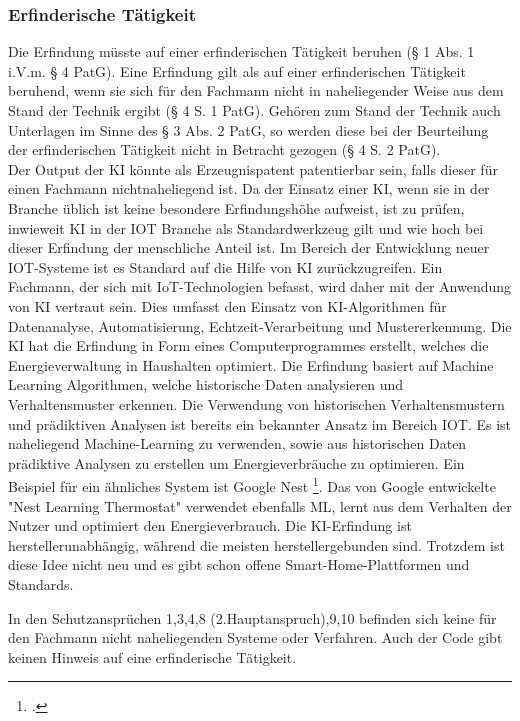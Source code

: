 \subsubsection{Erfinderische Tätigkeit}
Die Erfindung müsste auf einer erfinderischen Tätigkeit beruhen (§ 1 Abs. 1 i.V.m. § 4 PatG).
Eine Erfindung gilt als auf einer erfinderischen Tätigkeit beruhend, wenn sie sich für den Fachmann
nicht in naheliegender Weise aus dem Stand der Technik ergibt (§ 4 S. 1 PatG). Gehören zum Stand
der Technik auch Unterlagen im Sinne des § 3 Abs. 2 PatG, so werden diese bei der Beurteilung der
erfinderischen Tätigkeit nicht in Betracht gezogen (§ 4 S. 2 PatG).
\\
Der Output der KI könnte als Erzeugnispatent patentierbar sein,
falls dieser für einen Fachmann nichtnaheliegend ist.
Da der Einsatz einer KI, wenn sie in der Branche üblich ist keine besondere
Erfindungshöhe aufweist, ist zu prüfen, inwieweit KI in der IOT Branche
als Standardwerkzeug gilt und wie hoch bei dieser Erfindung der menschliche 
Anteil ist. Im Bereich der Entwicklung neuer IOT-Systeme ist es Standard auf
die Hilfe von KI zurückzugreifen. 
Ein Fachmann, der sich mit IoT-Technologien befasst, wird daher mit der Anwendung von KI 
vertraut sein. 
Dies umfasst den Einsatz von KI-Algorithmen für Datenanalyse, 
Automatisierung, Echtzeit-Verarbeitung und Mustererkennung.
Die KI hat die Erfindung in Form eines Computerprogrammes erstellt,
welches die Energieverwaltung in Haushalten optimiert.
Die Erfindung basiert auf Machine Learning Algorithmen, welche
historische Daten analysieren und Verhaltensmuster erkennen.
Die Verwendung von historischen Verhaltensmustern und prädiktiven
Analysen ist bereits ein bekannter Ansatz im Bereich IOT.
Es
ist naheliegend Machine-Learning zu verwenden, 
sowie aus historischen Daten prädiktive Analysen
zu erstellen um 
Energieverbräuche zu optimieren. Ein
Beispiel für ein ähnliches System ist 
Google Nest \footcite{YourHelpfulHome}.
Das von Google entwickelte "Nest Learning Thermostat" verwendet
ebenfalls ML, lernt aus dem Verhalten der Nutzer und
optimiert den Energieverbrauch.
Die KI-Erfindung ist herstellerunabhängig, während
die meisten herstellergebunden sind. Trotzdem ist 
diese Idee nicht neu und es gibt schon 
offene Smart-Home-Plattformen und Standards.

In den Schutzansprüchen 1,3,4,8 (2.Hauptanspruch),9,10
befinden sich keine für den Fachmann nicht naheliegenden
Systeme oder Verfahren. Auch der Code gibt keinen
Hinweis auf eine erfinderische Tätigkeit.

